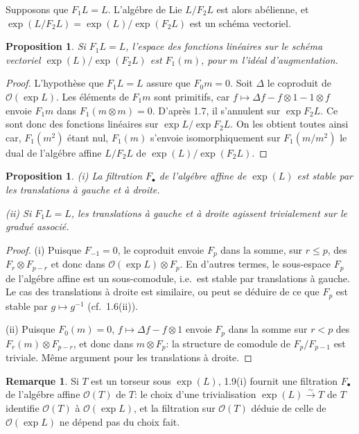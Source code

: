 \documentclass[11pt,a4paper]{article}
\theoremstyle{plain}
\newtheorem{proposition}[theorem]{Proposition}
\theoremstyle{definition}
\newtheorem{remark}[theorem]{Remarque}
\begin{document}
Supposons que $F_1L = L$. L'alg\'ebre de Lie $L/F_2L$ est alors ab\'elienne, et $\exp(L/F_2L) = \exp(L)/\exp(F_2L)$ est un sch\'ema vectoriel.

\begin{proposition}
\label{prop:1.8}
Si $F_1L = L$, l'espace des fonctions lin\'eaires sur le sch\'ema vectoriel $\exp(L)/\exp(F_2L)$ est $F_1(m)$, pour $m$ l'id\'eal d'augmentation.
\end{proposition}

\begin{proof}
L'hypoth\`ese que $F_1L = L$ assure que $F_0m = 0$. Soit $\Delta$ le coproduit de $\mathcal{O}(\exp L)$. Les \'el\'ements de $F_1m$ sont primitifs, car $f \mapsto \Delta f - f \otimes 1 - 1 \otimes f$ envoie $F_1m$ dans $F_1(m \otimes m) = 0$. D'apr\`es 1.7, il s'annulent sur $\exp F_2L$. Ce sont donc des fonctions lin\'eaires sur $\exp L/\exp F_2L$. On les obtient toutes ainsi car, $F_1(m^2)$ \'etant nul, $F_1(m)$ s'envoie isomorphiquement sur $F_1(m/m^2)$ le dual de l'alg\'ebre affine $L/F_2L$ de $\exp(L)/\exp(F_2L)$.
\end{proof}

\begin{proposition}
\label{prop:1.9}
\emph{(i)} La filtration $F_{\bullet}$ de l'alg\'ebre affine de $\exp(L)$ est stable par les translations \`a gauche et \`a droite.

\emph{(ii)} Si $F_1L = L$, les translations \`a gauche et \`a droite agissent trivialement sur le gradu\'e associ\'e.
\end{proposition}

\begin{proof}
(i) Puisque $F_{-1} = 0$, le coproduit envoie $F_p$ dans la somme, sur $r \leq p$, des $F_r \otimes F_{p-r}$ et donc dans $\mathcal{O}(\exp L) \otimes F_p$. En d'autres termes, le sous-espace $F_p$ de l'alg\'ebre affine est un sous-comodule, i.e.~est stable par translations \`a gauche. Le cas des translations \`a droite est similaire, ou peut se d\'eduire de ce que $F_p$ est stable par $g \mapsto g^{-1}$ (cf.~1.6(ii)).

(ii) Puisque $F_0(m) = 0$, $f \mapsto \Delta f - f \otimes 1$ envoie $F_p$ dans la somme sur $r < p$ des $F_r(m) \otimes F_{p-r}$, et donc dans $m \otimes F_p$: la structure de comodule de $F_p/F_{p-1}$ est triviale. M\^eme argument pour les translations \`a droite.
\end{proof}

\begin{remark}
\label{rmk:1.10}
Si $T$ est un torseur sous $\exp(L)$, 1.9(i) fournit une filtration $F_{\bullet}$ de l'alg\'ebre affine $\mathcal{O}(T)$ de $T$: le choix d'une trivialisation $\exp(L) \xrightarrow{\sim} T$ de $T$ identifie $\mathcal{O}(T)$ \`a $\mathcal{O}(\exp L)$, et la filtration sur $\mathcal{O}(T)$ d\'eduie de celle de $\mathcal{O}(\exp L)$ ne d\'epend pas du choix fait.
\end{remark}
\end{document}
